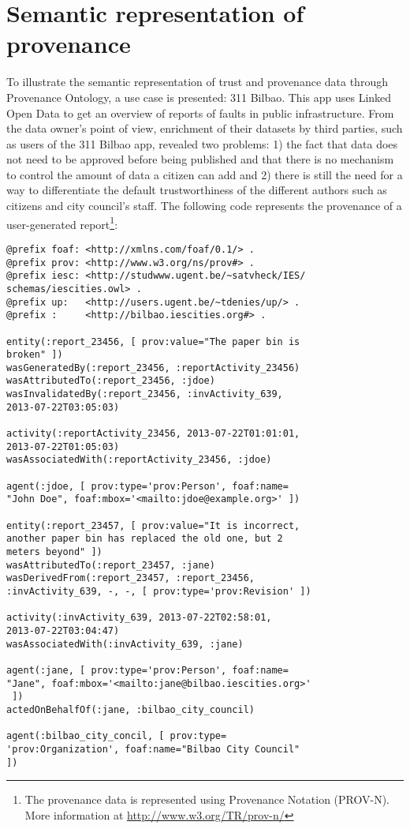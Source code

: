 \section{Semantic representation of provenance}
\label{sec:use_cases}

To illustrate the semantic representation of trust and provenance data through Provenance Ontology, a use case is presented: 311 Bilbao. This app uses Linked Open Data to get an overview of reports of faults in public infrastructure. From the data owner’s point of view, enrichment of their datasets by third parties, such as users of the 311 Bilbao app, revealed two problems: 1) the fact that data does not need to be approved before being published and that there is no mechanism to control the amount of data a citizen can add and 2) there is still the need for a way to differentiate the default trustworthiness of the different authors such as citizens and city council's staff. The following code represents the provenance of a user-generated report\footnote{The provenance data is represented using Provenance Notation (PROV-N). More information at \url{http://www.w3.org/TR/prov-n/}}:

\lstset{numbers=left, basicstyle=\ttfamily\scriptsize,}
\begin{lstlisting}
@prefix foaf: <http://xmlns.com/foaf/0.1/> .
@prefix prov: <http://www.w3.org/ns/prov#> .
@prefix iesc: <http://studwww.ugent.be/~satvheck/IES/
schemas/iescities.owl> .
@prefix up:   <http://users.ugent.be/~tdenies/up/> .
@prefix :     <http://bilbao.iescities.org#> .

entity(:report_23456, [ prov:value="The paper bin is
broken" ])
wasGeneratedBy(:report_23456, :reportActivity_23456)
wasAttributedTo(:report_23456, :jdoe)
wasInvalidatedBy(:report_23456, :invActivity_639,
2013-07-22T03:05:03)

activity(:reportActivity_23456, 2013-07-22T01:01:01,
2013-07-22T01:05:03)
wasAssociatedWith(:reportActivity_23456, :jdoe)

agent(:jdoe, [ prov:type='prov:Person', foaf:name=
"John Doe", foaf:mbox='<mailto:jdoe@example.org>' ])

entity(:report_23457, [ prov:value="It is incorrect,
another paper bin has replaced the old one, but 2
meters beyond" ])
wasAttributedTo(:report_23457, :jane)
wasDerivedFrom(:report_23457, :report_23456,
:invActivity_639, -, -, [ prov:type='prov:Revision' ])

activity(:invActivity_639, 2013-07-22T02:58:01,
2013-07-22T03:04:47)
wasAssociatedWith(:invActivity_639, :jane)

agent(:jane, [ prov:type='prov:Person', foaf:name=
"Jane", foaf:mbox='<mailto:jane@bilbao.iescities.org>'
 ])
actedOnBehalfOf(:jane, :bilbao_city_council)

agent(:bilbao_city_concil, [ prov:type=
'prov:Organization', foaf:name="Bilbao City Council"
])

\end{lstlisting}

